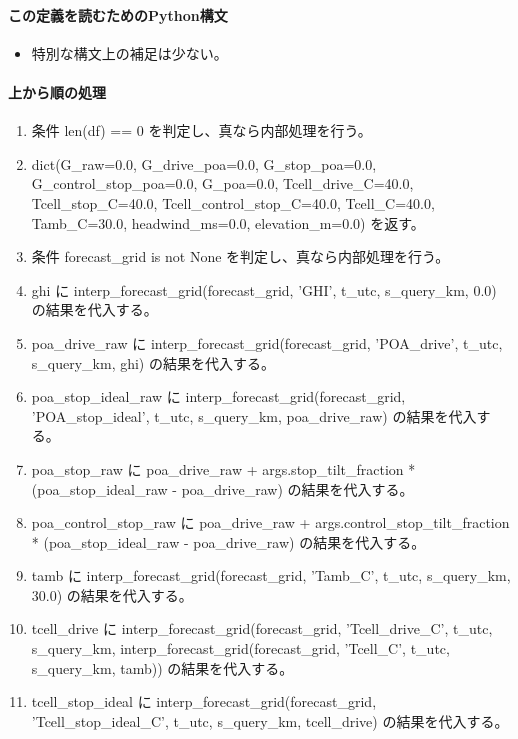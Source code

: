 \documentclass[a4paper,11pt]{article}
\begin{document}
            \paragraph{この定義を読むためのPython構文}
            \begin{itemize}[leftmargin=1.6em]
            \item 特別な構文上の補足は少ない。
            \end{itemize}
            \paragraph{上から順の処理}
            \begin{enumerate}[leftmargin=1.8em]
            \item 条件 len(df) == 0 を判定し、真なら内部処理を行う。
\item   dict(G\_raw=0.0, G\_drive\_poa=0.0, G\_stop\_poa=0.0, G\_control\_stop\_poa=0.0, G\_poa=0.0, Tcell\_drive\_C=40.0, Tcell\_stop\_C=40.0, Tcell\_control\_stop\_C=40.0, Tcell\_C=40.0, Tamb\_C=30.0, headwind\_ms=0.0, elevation\_m=0.0) を返す。
\item 条件 forecast\_grid is not None を判定し、真なら内部処理を行う。
\item   ghi に interp\_forecast\_grid(forecast\_grid, 'GHI', t\_utc, s\_query\_km, 0.0) の結果を代入する。
\item   poa\_drive\_raw に interp\_forecast\_grid(forecast\_grid, 'POA\_drive', t\_utc, s\_query\_km, ghi) の結果を代入する。
\item   poa\_stop\_ideal\_raw に interp\_forecast\_grid(forecast\_grid, 'POA\_stop\_ideal', t\_utc, s\_query\_km, poa\_drive\_raw) の結果を代入する。
\item   poa\_stop\_raw に poa\_drive\_raw + args.stop\_tilt\_fraction * (poa\_stop\_ideal\_raw - poa\_drive\_raw) の結果を代入する。
\item   poa\_control\_stop\_raw に poa\_drive\_raw + args.control\_stop\_tilt\_fraction * (poa\_stop\_ideal\_raw - poa\_drive\_raw) の結果を代入する。
\item   tamb に interp\_forecast\_grid(forecast\_grid, 'Tamb\_C', t\_utc, s\_query\_km, 30.0) の結果を代入する。
\item   tcell\_drive に interp\_forecast\_grid(forecast\_grid, 'Tcell\_drive\_C', t\_utc, s\_query\_km, interp\_forecast\_grid(forecast\_grid, 'Tcell\_C', t\_utc, s\_query\_km, tamb)) の結果を代入する。
\item   tcell\_stop\_ideal に interp\_forecast\_grid(forecast\_grid, 'Tcell\_stop\_ideal\_C', t\_utc, s\_query\_km, tcell\_drive) の結果を代入する。

\end{enumerate}
\end{document}
